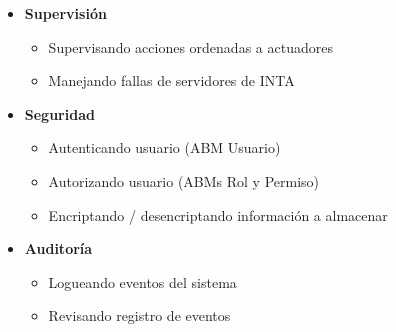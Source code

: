 \begin{itemize}
\begin{itemize}
    \end{itemize}
    \item \textbf{Supervisión}
    \begin{itemize} \itemsep -2pt
    	\item Supervisando acciones ordenadas a actuadores
        \item Manejando fallas de servidores de INTA
    \end{itemize}
    \item \textbf{Seguridad}
    \begin{itemize} \itemsep -2pt
		\item Autenticando usuario (ABM Usuario)
		\item Autorizando usuario (ABMs Rol y Permiso)
		\item Encriptando / desencriptando información a almacenar
    \end{itemize}
    \item \textbf{Auditoría}
    \begin{itemize} \itemsep -2pt
    	\item Logueando eventos del sistema
		\item Revisando registro de eventos
    \end{itemize}
\end{itemize}

